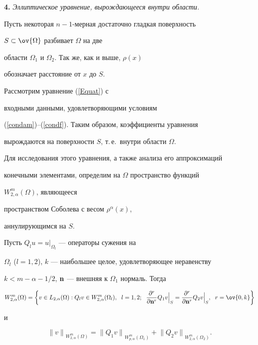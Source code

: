 {\bf 4.} {\it Эллиптическое уравнение, вырождающееся внутри области.}


Пусть некоторая $n{-}1$-мер\-ная достаточно гладкая поверхность 


$S \subset \ov{\Omega}$ разбивает $\Omega$ на две 


области $\Omega_1$ и $\Omega_2$. Так же, как и выше, $\rho (x)$


обозначает расстояние от $x$ до $S$. 


Рассмотрим уравнение (\ref{Equat}) с


входными данными, удовлетворяющими условиям


(\ref{condam})--(\ref{condf}). Таким образом, коэффициенты уравнения 


вырождаются на поверхности $S$, т.\,е.~внутри области $\Omega$. 


Для исследования этого уравнения, а также анализа его аппроксимаций


конечными элементами, определим на $\Omega$ пространство функций 


$W_{2,\alpha}^m(\Omega)$, являющееся


пространством Соболева с весом $\rho^\alpha (x)$,


аннулирующимся на $S$. 


Пусть $Q_l u = u|_{\Omega_l}$ --- операторы сужения на 


$\Omega_l$ ($l=1,2$), $k$ --- наибольшее целое, удовлетворяющее неравенству


$k<m-\alpha-1/2$, ${\bold n}$ --- внешняя к $\Omega_1$ нормаль. Тогда


$$


W_{2,\alpha}^m(\Omega) = \bigg\{ v \in L_{2,\alpha}(\Omega):


Q_l v \in W_{2,\alpha}^m(\Omega_l),\ \; l=1,2;\ \;


{\frac{\partial ^r}{\partial {\bold n^r}}


Q_1 v \Big|}_S ={\frac{\partial ^r}{\partial {\bold n^r}}


Q_2 v \Big|}_S,\ \; r=\ov{0,k} \bigg\}


$$


и


$$


{\| {v} \|}_{W_{2, \alpha}^m(\Omega)}=


{\| {Q_1 v} \|}_{W_{p, \alpha}^m(\Omega_1)}+


{\| {Q_2 v} \|}_{W_{2, \alpha}^m(\Omega_2)}.


$$


